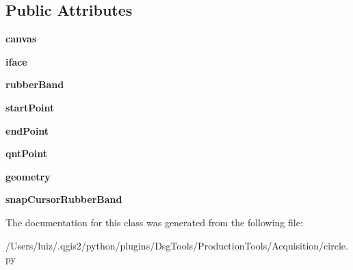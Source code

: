 \subsection*{Public Attributes}
\begin{DoxyCompactItemize}
\item 
\mbox{\label{class_dsg_tools_1_1_production_tools_1_1_acquisition_1_1circle_1_1_circle_a575ff65c2033ca411e3d2a69350c0890}} 
{\bfseries canvas}
\item 
\mbox{\label{class_dsg_tools_1_1_production_tools_1_1_acquisition_1_1circle_1_1_circle_ac7e899f3a84c9226490286f98410f389}} 
{\bfseries iface}
\item 
\mbox{\label{class_dsg_tools_1_1_production_tools_1_1_acquisition_1_1circle_1_1_circle_ac4767a61bc2d2f1c5df778579736800a}} 
{\bfseries rubber\+Band}
\item 
\mbox{\label{class_dsg_tools_1_1_production_tools_1_1_acquisition_1_1circle_1_1_circle_aef166e1a776fe2f1d25914e66d57a4ee}} 
{\bfseries start\+Point}
\item 
\mbox{\label{class_dsg_tools_1_1_production_tools_1_1_acquisition_1_1circle_1_1_circle_a14ee401f8b9637eecadcae5f23c31e01}} 
{\bfseries end\+Point}
\item 
\mbox{\label{class_dsg_tools_1_1_production_tools_1_1_acquisition_1_1circle_1_1_circle_ade87a081d71231f84ccfda787dea4d0b}} 
{\bfseries qnt\+Point}
\item 
\mbox{\label{class_dsg_tools_1_1_production_tools_1_1_acquisition_1_1circle_1_1_circle_a154c8f4f8d46913f708bda38991113e3}} 
{\bfseries geometry}
\item 
\mbox{\label{class_dsg_tools_1_1_production_tools_1_1_acquisition_1_1circle_1_1_circle_a372e97e5b8878e1e6c65668d8881fb46}} 
{\bfseries snap\+Cursor\+Rubber\+Band}
\end{DoxyCompactItemize}


The documentation for this class was generated from the following file\+:\begin{DoxyCompactItemize}
\item 
/\+Users/luiz/.\+qgis2/python/plugins/\+Dsg\+Tools/\+Production\+Tools/\+Acquisition/circle.\+py\end{DoxyCompactItemize}
